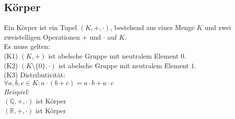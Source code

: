 \subsection*{Körper}
Ein Körper ist ein Tupel $(K,+,\cdot)$, bestehend aus einer Menge $K$ und zwei 
zweistelligen Operationen $+$ und $\cdot$ auf $K$.\\
Es muss gelten:\\
(K1) $(K,+)$ ist abelsche Gruppe mit neutralem Element $0$.\\
(K2) $(K\setminus \{0\},\cdot)$ ist abelsche Gruppe mit neutralem Element $1$.\\
(K3) Distributivität:\\
$\forall a,b,c\in K:a\cdot (b+c)=a\cdot b+a\cdot c$\\
\emph{Beispiel:}\\
$(\mathbb{Q},+,\cdot)$ ist Körper\\
$(\mathbb{R},+,\cdot)$ ist Körper
